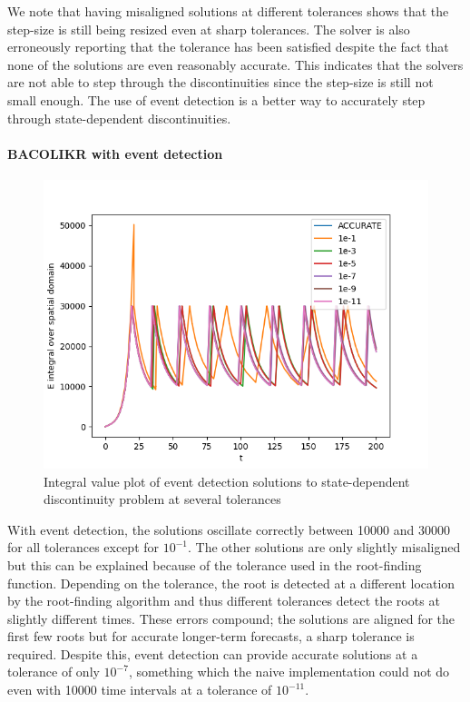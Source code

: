 \documentclass{article}
\begin{document}
We note that having misaligned solutions at different tolerances shows that the step-size is still being resized even at sharp tolerances. The solver is also erroneously reporting that the tolerance has been satisfied despite the fact that none of the solutions are even reasonably accurate. This indicates that the solvers are not able to step through the discontinuities since the step-size is still not small enough. The use of event detection is a better way to accurately step through state-dependent discontinuities.

\paragraph{BACOLIKR with event detection}
\begin{figure}[H]
\centering
\includegraphics[width=0.7\linewidth]{./figures/pde_state_disc_tol_event}
\caption{Integral value plot of event detection solutions to state-dependent discontinuity problem at several tolerances}
\label{fig:pde_state_disc_tol_event}
\end{figure}

With event detection, the solutions oscillate correctly between 10000 and 30000 for all tolerances except for $10^{-1}$. The other solutions are only slightly misaligned but this can be explained because of the tolerance used in the root-finding function. Depending on the tolerance, the root is detected at a different location by the root-finding algorithm and thus different tolerances detect the roots at slightly different times. These errors compound; the solutions are aligned for the first few roots but for accurate longer-term forecasts, a sharp tolerance is required. Despite this, event detection can provide accurate solutions at a tolerance of only $10^{-7}$, something which the naive implementation could not do even with 10000 time intervals at a tolerance of $10^{-11}$.
\end{document}
